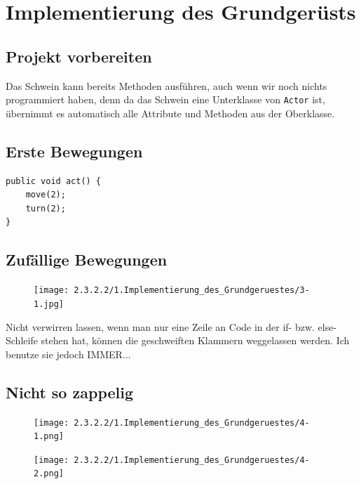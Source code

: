\documentclass{scrartcl}   %
\begin{document}
\cleardoublepage

\section{Implementierung des Grundgerüsts}

\subsection{Projekt vorbereiten}

Das Schwein kann bereits Methoden ausführen, auch wenn wir noch nichts programmiert haben, denn da das Schwein eine Unterklasse von \texttt{Actor} ist, übernimmt es automatisch alle Attribute und Methoden aus der Oberklasse.

\subsection{Erste Bewegungen}

\begin{lstlisting}
public void act() {
    move(2);
    turn(2);
}
\end{lstlisting}

\subsection{Zufällige Bewegungen}

\begin{figure}[ht]
	\centering
	\texttt{[image: 2.3.2.2/1.Implementierung\_des\_Grundgeruestes/3-1.jpg]}
\end{figure}

Nicht verwirren lassen, wenn man nur eine Zeile an Code in der if- bzw. else-Schleife stehen hat, können die geschweiften Klammern weggelassen werden. Ich benutze sie jedoch IMMER...

\newpage

\subsection{Nicht so zappelig}

\begin{figure}[ht]
	\centering
	\texttt{[image: 2.3.2.2/1.Implementierung\_des\_Grundgeruestes/4-1.png]}
\end{figure}

\begin{figure}[ht]
	\centering
	\texttt{[image: 2.3.2.2/1.Implementierung\_des\_Grundgeruestes/4-2.png]}
\end{figure}
\end{document}
